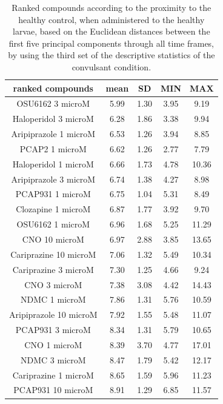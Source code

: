 \documentclass[a4paper,12pt]{article}
\begin{document}
\begin{table}[h!]\tiny
\centering
\caption{Ranked compounds according to the proximity to the healthy control, when administered to the healthy larvae, based on the Euclidean distances between the first five principal components through all time frames, by using the third set of the descriptive statistics of the convulsant condition.}
\begin{tabular}{|c|c|c|c|c|}
\hline
ranked compounds             & mean & SD   & MIN  & MAX   \\ \hline
OSU6162 3 microM       & 5.99  & 1.30  & 3.95 & 9.19  \\ \hline
Haloperidol 3 microM   & 6.28  & 1.86 & 3.38 & 9.94  \\ \hline
Aripiprazole 1 microM  & 6.53  & 1.26 & 3.94 & 8.85  \\ \hline
PCAP2 1 microM         & 6.62  & 1.26 & 2.77 & 7.79  \\ \hline
Haloperidol 1 microM   & 6.66  & 1.73 & 4.78 & 10.36 \\ \hline
Aripiprazole 3 microM  & 6.74  & 1.38 & 4.27 & 8.98  \\ \hline
PCAP931 1 microM       & 6.75  & 1.04 & 5.31 & 8.49  \\ \hline
Clozapine 1 microM     & 6.87  & 1.77 & 3.92 & 9.70   \\ \hline
OSU6162 1 microM       & 6.96  & 1.68 & 5.25 & 11.29 \\ \hline
CNO 10 microM          & 6.97  & 2.88 & 3.85 & 13.65 \\ \hline
Cariprazine 10 microM  & 7.06  & 1.32 & 5.49 & 10.34 \\ \hline
Cariprazine 3 microM   & 7.30   & 1.25 & 4.66 & 9.24  \\ \hline
CNO 3 microM           & 7.38  & 3.08 & 4.42 & 14.43 \\ \hline
NDMC 1 microM          & 7.86  & 1.31 & 5.76 & 10.59 \\ \hline
Aripiprazole 10 microM & 7.92  & 1.55 & 5.48 & 11.07 \\ \hline
PCAP931 3 microM       & 8.34  & 1.31 & 5.79 & 10.65 \\ \hline
CNO 1 microM           & 8.39  & 3.70  & 4.77 & 17.01 \\ \hline
NDMC 3 microM          & 8.47  & 1.79 & 5.42 & 12.17 \\ \hline
Cariprazine 1 microM   & 8.65  & 1.59 & 5.96 & 11.23 \\ \hline
PCAP931 10 microM      & 8.91  & 1.29 & 6.85 & 11.57 \\ \hline

\end{tabular}
\end{table}
\end{document}
